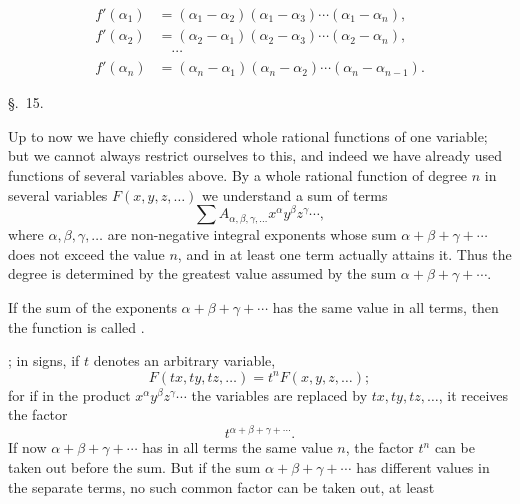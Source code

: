 
\begin{equation}
\begin{aligned}
 f'(\alpha_1)&=(\alpha_1-\alpha_2)(\alpha_1-\alpha_3)\cdots(\alpha_1-\alpha_n),\\
 f'(\alpha_2)&=(\alpha_2-\alpha_1)(\alpha_2-\alpha_3)\cdots(\alpha_2-\alpha_n),\\
 &\quad\cdots\\
 f'(\alpha_n)&=(\alpha_n-\alpha_1)(\alpha_n-\alpha_2)\cdots(\alpha_n-\alpha_{n-1}).
\end{aligned}
\tag{12}
\end{equation}

\begin{center}
{\large \S.\ 15.}

\vspace{0.5em}
{\large{}}
\end{center}

Up to now we have chiefly considered whole rational functions of one variable; but we cannot always restrict ourselves to this, and indeed we have already used functions of several variables above. By a whole rational function of degree $n$ in several variables $F(x,y,z,\ldots)$ we understand a sum of terms
\[
 \sum A_{\alpha,\beta,\gamma,\ldots}x^\alpha y^\beta z^\gamma\cdots,
\]
where $\alpha,\beta,\gamma,\ldots$ are non-negative integral exponents whose sum $\alpha+\beta+\gamma+\cdots$ does not exceed the value $n$, and in at least one term actually attains it. Thus the degree is determined by the greatest value assumed by the sum $\alpha+\beta+\gamma+\cdots$.

If the sum of the exponents $\alpha+\beta+\gamma+\cdots$ has the same value in all terms, then the function is called .

; in signs, if $t$ denotes an arbitrary variable,
\begin{equation}
 F(tx,ty,tz,\ldots)=t^nF(x,y,z,\ldots);
\tag{1}
\end{equation}
for if in the product $x^\alpha y^\beta z^\gamma\cdots$ the variables are replaced by $tx,ty,tz,\ldots$, it receives the factor
\[
 t^{\alpha+\beta+\gamma+\cdots}.
\]
If now $\alpha+\beta+\gamma+\cdots$ has in all terms the same value $n$, the factor $t^n$ can be taken out before the sum. But if the sum $\alpha+\beta+\gamma+\cdots$ has different values in the separate terms, no such common factor can be taken out, at least
